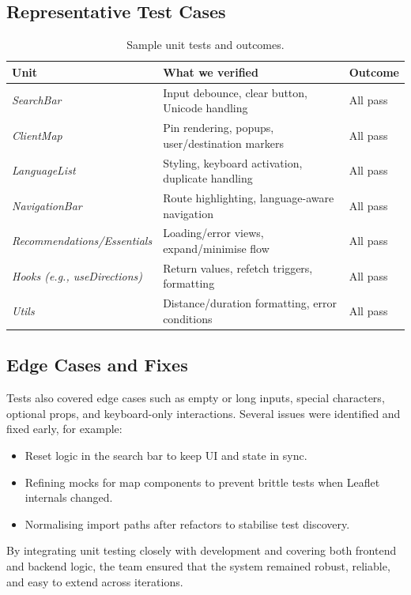 \subsection{Representative Test Cases}
\begin{table}[h!]
\centering
\small
\begin{tabular}{p{3.2cm} p{6.7cm} p{3.2cm}}
\toprule
\textbf{Unit} & \textbf{What we verified} & \textbf{Outcome}\\
\midrule
\textit{SearchBar} & Input debounce, clear button, Unicode handling & All pass \\
\textit{ClientMap} & Pin rendering, popups, user/destination markers & All pass \\
\textit{LanguageList} & Styling, keyboard activation, duplicate handling & All pass \\
\textit{NavigationBar} & Route highlighting, language-aware navigation & All pass \\
\textit{Recommendations/Essen\-tials} & Loading/error views, expand/minimise flow & All pass \\
\textit{Hooks (e.g., useDirections)} & Return values, refetch triggers, formatting & All pass \\
\textit{Utils} & Distance/duration formatting, error conditions & All pass \\
\bottomrule
\end{tabular}
\caption{Sample unit tests and outcomes.}
\label{tab:unit-tests}
\end{table}

\subsection{Edge Cases and Fixes}
Tests also covered edge cases such as empty or long inputs, special characters, optional props, and keyboard-only interactions. Several issues were identified and fixed early, for example:
\begin{itemize} \itemsep0pt \parskip0pt
    \item Reset logic in the search bar to keep UI and state in sync.
    \item Refining mocks for map components to prevent brittle tests when Leaflet internals changed.
    \item Normalising import paths after refactors to stabilise test discovery.
\end{itemize}

\noindent By integrating unit testing closely with development and covering both frontend and backend logic, the team ensured that the system remained robust, reliable, and easy to extend across iterations.
